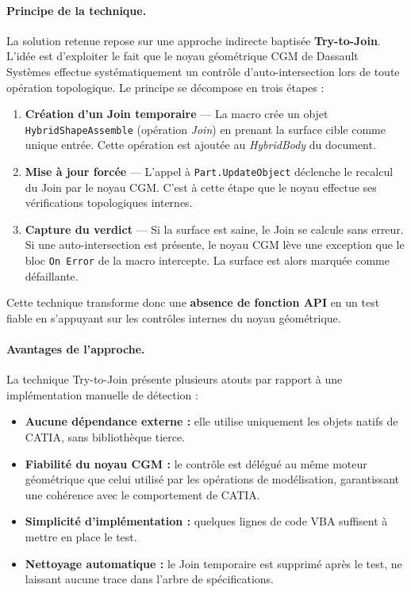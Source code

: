 \paragraph{Principe de la technique.}
La solution retenue repose sur une approche indirecte baptisée \textbf{Try-to-Join}. L'idée est d'exploiter le fait que le noyau géométrique CGM de Dassault Systèmes effectue systématiquement un contrôle d'auto-intersection lors de toute opération topologique. Le principe se décompose en trois étapes :

\begin{enumerate}
    \item \textbf{Création d'un Join temporaire} --- La macro crée un objet \texttt{HybridShapeAssemble} (opération \textit{Join}) en prenant la surface cible comme unique entrée. Cette opération est ajoutée au \textit{HybridBody} du document.
    \item \textbf{Mise à jour forcée} --- L'appel à \texttt{Part.UpdateObject} déclenche le recalcul du Join par le noyau CGM. C'est à cette étape que le noyau effectue ses vérifications topologiques internes.
    \item \textbf{Capture du verdict} --- Si la surface est saine, le Join se calcule sans erreur. Si une auto-intersection est présente, le noyau CGM lève une exception que le bloc \texttt{On Error} de la macro intercepte. La surface est alors marquée comme défaillante.
\end{enumerate}

Cette technique transforme donc une \textbf{absence de fonction API} en un test fiable en s'appuyant sur les contrôles internes du noyau géométrique.

\paragraph{Avantages de l'approche.}
La technique Try-to-Join présente plusieurs atouts par rapport à une implémentation manuelle de détection :

\begin{itemize}
    \item[•] \textbf{Aucune dépendance externe :} elle utilise uniquement les objets natifs de CATIA, sans bibliothèque tierce.
    \item[•] \textbf{Fiabilité du noyau CGM :} le contrôle est délégué au même moteur géométrique que celui utilisé par les opérations de modélisation, garantissant une cohérence avec le comportement de CATIA.
    \item[•] \textbf{Simplicité d'implémentation :} quelques lignes de code VBA suffisent à mettre en place le test.
    \item[•] \textbf{Nettoyage automatique :} le Join temporaire est supprimé après le test, ne laissant aucune trace dans l'arbre de spécifications.
\end{itemize}

